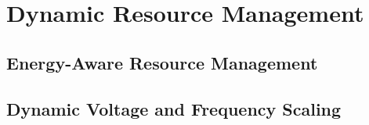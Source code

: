\section{Dynamic Resource Management}
\label{sec:dynamic_resource_management}

\subsection{Energy-Aware Resource Management}
\label{sec:energy-aware_resource_management}

\subsection{Dynamic Voltage and Frequency Scaling}
\label{sec:dynamic_voltage_and_frequency_scaling}

